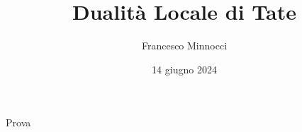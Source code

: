 \documentclass[pdf]{beamer}
\title{Dualità Locale di Tate}
\date{14 giugno 2024}
\author{Francesco Minnocci}
\begin{document}
    \begin{frame}
\titlepage
    \end{frame}
    \begin{frame}
Prova
    \end{frame}
\end{document}
